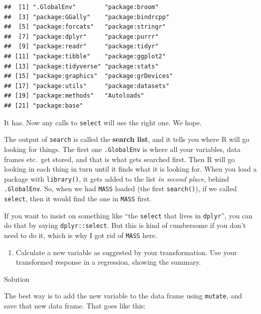 \documentclass[]{tufte-book}
\providecommand{\tightlist}{%
  \setlength{\itemsep}{0pt}\setlength{\parskip}{0pt}}
\theoremstyle{definition}
\theoremstyle{definition}
\theoremstyle{definition}
\theoremstyle{remark}
\begin{document}
\begin{verbatim}
##  [1] ".GlobalEnv"        "package:broom"    
##  [3] "package:GGally"    "package:bindrcpp" 
##  [5] "package:forcats"   "package:stringr"  
##  [7] "package:dplyr"     "package:purrr"    
##  [9] "package:readr"     "package:tidyr"    
## [11] "package:tibble"    "package:ggplot2"  
## [13] "package:tidyverse" "package:stats"    
## [15] "package:graphics"  "package:grDevices"
## [17] "package:utils"     "package:datasets" 
## [19] "package:methods"   "Autoloads"        
## [21] "package:base"
\end{verbatim}

It has. Now any calls to \texttt{select} will use the right one. We
hope.

The output of \texttt{search} is called the \textbf{search list}, and it
tells you where R will go looking for things. The first one
\texttt{.GlobalEnv} is where all
 your
variables, data frames etc.~get stored, and that is what gets searched
first.
Then R will go looking in each thing in turn until it finds what it is
looking for. When you load a package with \texttt{library()}, it gets
added to the list \emph{in second place}, behind \texttt{.GlobalEnv}.
So, when we had \texttt{MASS} loaded (the first \texttt{search()}), if
we called \texttt{select}, then it would find the one in \texttt{MASS}
first.

If you want to insist on something like ``the \texttt{select} that lives
in \texttt{dplyr}'', you can do that by saying \texttt{dplyr::select}.
But this is kind of cumbersome if you don't need to do it, which is why
I got rid of \texttt{MASS} here.

\begin{enumerate}
\def\labelenumi{(\alph{enumi})}
\setcounter{enumi}{5}
\tightlist
\item
  Calculate a new variable as suggested by your transformation. Use your
  transformed response in a regression, showing the summary.
\end{enumerate}

Solution

The best way is to add the new variable to the data frame using
\texttt{mutate}, and save that new data frame. That goes like this:
\end{document}

